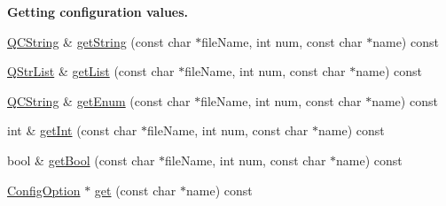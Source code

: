 \begin{Indent}{\bf Getting configuration values.}\par
\begin{DoxyCompactItemize}
\item 
\hyperlink{class_q_c_string}{Q\-C\-String} \& \hyperlink{class_config_a68612104bbf38f8e3f73d777f3bd641a}{get\-String} (const char $\ast$file\-Name, int num, const char $\ast$name) const 
\item 
\hyperlink{class_q_str_list}{Q\-Str\-List} \& \hyperlink{class_config_a8fb1a4b9d3bc2c3d7712d24526fea32d}{get\-List} (const char $\ast$file\-Name, int num, const char $\ast$name) const 
\item 
\hyperlink{class_q_c_string}{Q\-C\-String} \& \hyperlink{class_config_a84395f0a27ff06a395259b1aa1376433}{get\-Enum} (const char $\ast$file\-Name, int num, const char $\ast$name) const 
\item 
int \& \hyperlink{class_config_a0adeb5980707ff5556cbd43458e69b93}{get\-Int} (const char $\ast$file\-Name, int num, const char $\ast$name) const 
\item 
bool \& \hyperlink{class_config_a4636caa43638b30b87018ae139570f86}{get\-Bool} (const char $\ast$file\-Name, int num, const char $\ast$name) const 
\item 
\hyperlink{class_config_option}{Config\-Option} $\ast$ \hyperlink{class_config_a3e7953f08471ba22fa4da26a7f0042ed}{get} (const char $\ast$name) const 
\end{DoxyCompactItemize}
\end{Indent}
